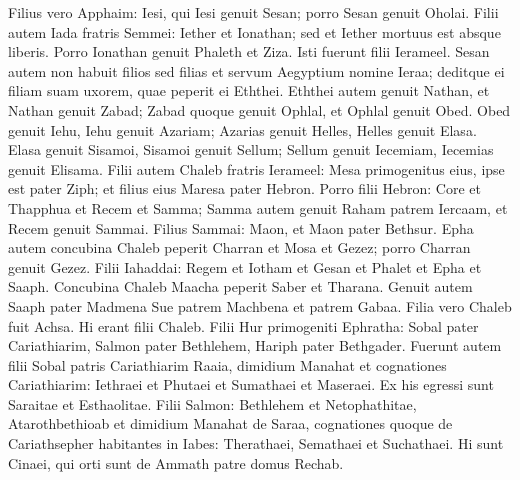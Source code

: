 \begin{biblechapter}
\verse Filius vero Apphaim: Iesi, qui Iesi genuit Sesan; porro Sesan genuit Oholai. 
\verse Filii autem Iada fratris Semmei: Iether et Ionathan; sed et Iether mortuus est absque liberis.  
\verse Porro Ionathan genuit Phaleth et Ziza. Isti fuerunt filii Ierameel. 
\verse Sesan autem non habuit filios sed filias et servum Aegyptium nomine Ieraa;  
\verse deditque ei filiam suam uxorem, quae peperit ei Eththei. 
\verse Eththei autem genuit Nathan, et Nathan genuit Zabad; 
\verse Zabad quoque genuit Ophlal, et Ophlal genuit Obed. 
\verse Obed genuit Iehu, Iehu genuit Azariam; 
\verse Azarias genuit Helles, Helles genuit Elasa.  
\verse Elasa genuit Sisamoi, Sisamoi genuit Sellum; 
\verse Sellum genuit Iecemiam, Iecemias genuit Elisama. 
\verse Filii autem Chaleb fratris Ierameel: Mesa primogenitus eius, ipse est pater Ziph; et filius eius Maresa pater Hebron. 
\verse Porro filii Hebron: Core et Thapphua et Recem et Samma; 
\verse Samma autem genuit Raham patrem Iercaam, et Recem genuit Sammai. 
\verse Filius Sammai: Maon, et Maon pater Bethsur. 
\verse Epha autem concubina Chaleb peperit Charran et Mosa et Gezez; porro Charran genuit Gezez. 
\verse Filii Iahaddai: Regem et Iotham et Gesan et Phalet et Epha et Saaph. 
\verse Concubina Chaleb Maacha peperit Saber et Tharana. 
\verse Genuit autem Saaph pater Madmena Sue patrem Machbena et patrem Gabaa. Filia vero Chaleb fuit Achsa.  
\verse Hi erant filii Chaleb. Filii Hur primogeniti Ephratha: Sobal pater Cariathiarim, 
\verse Salmon pater Bethlehem, Hariph pater Bethgader. 
\verse Fuerunt autem filii Sobal patris Cariathiarim Raaia, dimidium Manahat 
\verse et cognationes Cariathiarim: Iethraei et Phutaei et Sumathaei et Maseraei. Ex his egressi sunt Saraitae et Esthaolitae. 
\verse Filii Salmon: Bethlehem et Netophathitae, Atarothbethioab et dimidium Manahat de Saraa, 
\verse cognationes quoque de Cariathsepher habitantes in Iabes: Therathaei, Semathaei et Suchathaei. Hi sunt Cinaei, qui orti sunt de Ammath patre domus Rechab. 
\end{biblechapter}

